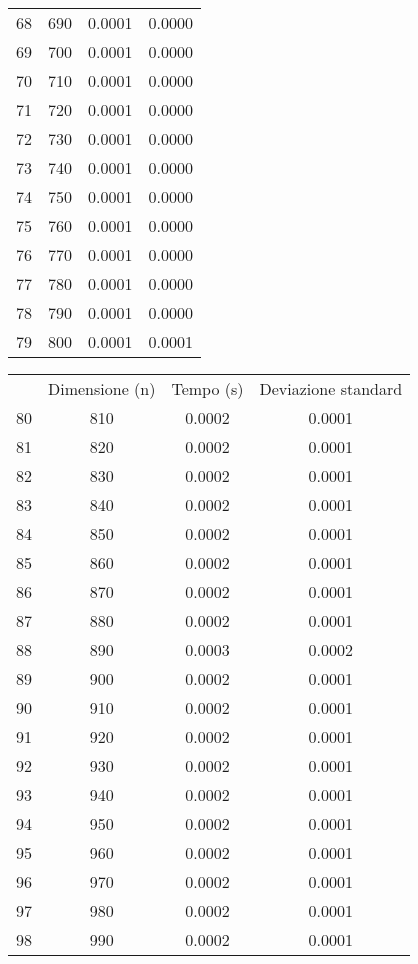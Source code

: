 \begin{table}
\begin{adjustbox}{width=1\textwidth/2}
\begin{tabular}{|c|c|c|c|}
68 & 690 & 0.0001 & 0.0000 \\
\cline{1-4}
69 & 700 & 0.0001 & 0.0000 \\
\cline{1-4}
70 & 710 & 0.0001 & 0.0000 \\
\cline{1-4}
71 & 720 & 0.0001 & 0.0000 \\
\cline{1-4}
72 & 730 & 0.0001 & 0.0000 \\
\cline{1-4}
73 & 740 & 0.0001 & 0.0000 \\
\cline{1-4}
74 & 750 & 0.0001 & 0.0000 \\
\cline{1-4}
75 & 760 & 0.0001 & 0.0000 \\
\cline{1-4}
76 & 770 & 0.0001 & 0.0000 \\
\cline{1-4}
77 & 780 & 0.0001 & 0.0000 \\
\cline{1-4}
78 & 790 & 0.0001 & 0.0000 \\
\cline{1-4}
79 & 800 & 0.0001 & 0.0001 \\
\cline{1-4}
\end{tabular}
\end{adjustbox}
\end{table}

\begin{table}
\centering
\begin{adjustbox}{width=1\textwidth/2}
\begin{tabular}{|c|c|c|c|}
\hline
 & Dimensione (n) & Tempo (s) & Deviazione standard \\
80 & 810 & 0.0002 & 0.0001 \\
\cline{1-4}
81 & 820 & 0.0002 & 0.0001 \\
\cline{1-4}
82 & 830 & 0.0002 & 0.0001 \\
\cline{1-4}
83 & 840 & 0.0002 & 0.0001 \\
\cline{1-4}
84 & 850 & 0.0002 & 0.0001 \\
\cline{1-4}
85 & 860 & 0.0002 & 0.0001 \\
\cline{1-4}
86 & 870 & 0.0002 & 0.0001 \\
\cline{1-4}
87 & 880 & 0.0002 & 0.0001 \\
\cline{1-4}
88 & 890 & 0.0003 & 0.0002 \\
\cline{1-4}
89 & 900 & 0.0002 & 0.0001 \\
\cline{1-4}
90 & 910 & 0.0002 & 0.0001 \\
\cline{1-4}
91 & 920 & 0.0002 & 0.0001 \\
\cline{1-4}
92 & 930 & 0.0002 & 0.0001 \\
\cline{1-4}
93 & 940 & 0.0002 & 0.0001 \\
\cline{1-4}
94 & 950 & 0.0002 & 0.0001 \\
\cline{1-4}
95 & 960 & 0.0002 & 0.0001 \\
\cline{1-4}
96 & 970 & 0.0002 & 0.0001 \\
\cline{1-4}
97 & 980 & 0.0002 & 0.0001 \\
\cline{1-4}
98 & 990 & 0.0002 & 0.0001 \\
\cline{1-4}
\end{tabular}
\end{adjustbox}
\end{table}

